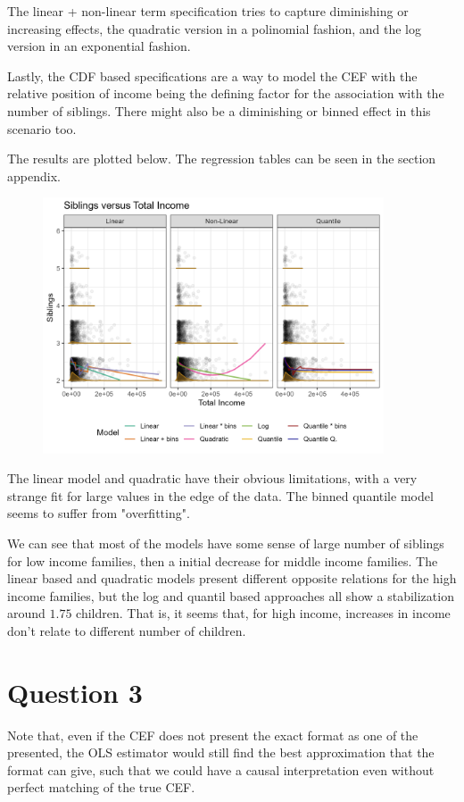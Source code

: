 \documentclass[12pt]{article}
\begin{document}
The linear + non-linear term specification tries to capture diminishing or increasing effects, the quadratic version in a polinomial fashion, and the log version in an exponential fashion.

Lastly, the CDF based specifications are a way to model the CEF with the relative position of income being the defining factor for the association with the number of siblings. There might also be a diminishing or binned effect in this scenario too. 

The results are plotted below. The regression tables can be seen in the section appendix.

\begin{figure}[!htbp]
    \centering
    \includegraphics[width=0.9\textwidth]{figures/cefs.png}
    \label{fig:cefs}
\end{figure}

The linear model and quadratic have their obvious limitations, with a very strange fit for large values in the edge of the data. The binned quantile model seems to suffer from "overfitting".

We can see that most of the models have some sense of large number of siblings for low income families, then a initial decrease for middle income families. The linear based and quadratic models present different opposite relations for the high income families, but the log and quantil based approaches all show a stabilization around $1.75$ children. That is, it seems that, for high income, increases in income don't relate to different number of children.


\section*{Question 3}
Note that, even if the CEF does not present the exact format as one of the presented, the OLS estimator would still find the best approximation that the format can give, such that we could have a causal interpretation even without perfect matching of the true CEF.
\end{document}
